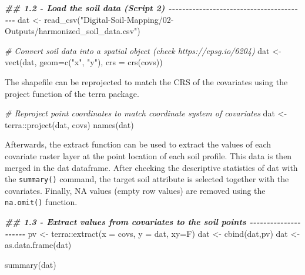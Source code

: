 \documentclass[
  10pt,
  b5paper,
  oneside]{book}
\newenvironment{Shaded}{\begin{snugshade}}{\end{snugshade}}
\newcommand{\AttributeTok}[1]{\textcolor[rgb]{0.77,0.63,0.00}{#1}}
\newcommand{\CommentTok}[1]{\textcolor[rgb]{0.56,0.35,0.01}{\textit{#1}}}
\newcommand{\DocumentationTok}[1]{\textcolor[rgb]{0.56,0.35,0.01}{\textbf{\textit{#1}}}}
\newcommand{\FunctionTok}[1]{\textcolor[rgb]{0.00,0.00,0.00}{#1}}
\newcommand{\NormalTok}[1]{#1}
\newcommand{\OtherTok}[1]{\textcolor[rgb]{0.56,0.35,0.01}{#1}}
\newcommand{\SpecialCharTok}[1]{\textcolor[rgb]{0.00,0.00,0.00}{#1}}
\newcommand{\StringTok}[1]{\textcolor[rgb]{0.31,0.60,0.02}{#1}}
\begin{document}
\begin{Shaded}
\begin{Highlighting}[]
\DocumentationTok{\#\# 1.2 {-} Load the soil data (Script 2) {-}{-}{-}{-}{-}{-}{-}{-}{-}{-}{-}{-}{-}{-}{-}{-}{-}{-}{-}{-}{-}{-}{-}{-}{-}{-}{-}{-}{-}{-}{-}{-}{-}{-}{-}{-}{-}{-}{-}{-}{-}}
\NormalTok{dat }\OtherTok{\textless{}{-}} \FunctionTok{read\_csv}\NormalTok{(}\StringTok{"Digital{-}Soil{-}Mapping/02{-}Outputs/harmonized\_soil\_data.csv"}\NormalTok{)}

\CommentTok{\# Convert soil data into a spatial object (check https://epsg.io/6204)}
\NormalTok{dat }\OtherTok{\textless{}{-}} \FunctionTok{vect}\NormalTok{(dat, }\AttributeTok{geom=}\FunctionTok{c}\NormalTok{(}\StringTok{"x"}\NormalTok{, }\StringTok{"y"}\NormalTok{), }\AttributeTok{crs =} \FunctionTok{crs}\NormalTok{(covs))}
\end{Highlighting}
\end{Shaded}

The shapefile can be reprojected to match the CRS of the covariates using the project function of the terra package.

\begin{Shaded}
\begin{Highlighting}[]
\CommentTok{\# Reproject point coordinates to match coordinate system of covariates}
\NormalTok{dat }\OtherTok{\textless{}{-}}\NormalTok{ terra}\SpecialCharTok{::}\FunctionTok{project}\NormalTok{(dat, covs)}
\FunctionTok{names}\NormalTok{(dat)}
\end{Highlighting}
\end{Shaded}

Afterwards, the extract function can be used to extract the values of each covariate raster layer at the point location of each soil profile. This data is then merged in the dat dataframe. After checking the descriptive statistics of dat with the \texttt{summary()} command, the target soil attribute is selected together with the covariates. Finally, NA values (empty row values) are removed using the \texttt{na.omit()} function.

\begin{Shaded}
\begin{Highlighting}[]
\DocumentationTok{\#\# 1.3 {-} Extract values from covariates to the soil points {-}{-}{-}{-}{-}{-}{-}{-}{-}{-}{-}{-}{-}{-}{-}{-}{-}{-}{-}{-}{-}}
\NormalTok{pv }\OtherTok{\textless{}{-}}\NormalTok{ terra}\SpecialCharTok{::}\FunctionTok{extract}\NormalTok{(}\AttributeTok{x =}\NormalTok{ covs, }\AttributeTok{y =}\NormalTok{ dat, }\AttributeTok{xy=}\NormalTok{F)}
\NormalTok{dat }\OtherTok{\textless{}{-}} \FunctionTok{cbind}\NormalTok{(dat,pv)}
\NormalTok{dat }\OtherTok{\textless{}{-}} \FunctionTok{as.data.frame}\NormalTok{(dat)}

\FunctionTok{summary}\NormalTok{(dat)}
\end{Highlighting}
\end{Shaded}
\end{document}
